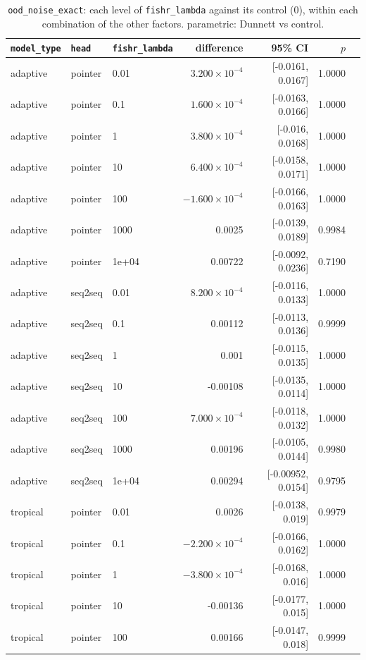 \documentclass[10pt]{article}
\begin{document}
{\small
\begin{longtable}{lllrrrl}
\caption{\texttt{ood\_noise\_exact}: each level of \texttt{fishr\_lambda} against its control (0), within each combination of the other factors. parametric: Dunnett vs control.}\label{tab:control-ood_noise_exact}\\
\toprule
\texttt{model\_type} & \texttt{head} & \texttt{fishr\_lambda} & difference & 95\% CI & $p$ & \\
\midrule
\endhead
adaptive & pointer & 0.01 & $3.200\times10^{-4}$ & [-0.0161, 0.0167] & 1.0000 & \\
adaptive & pointer & 0.1 & $1.600\times10^{-4}$ & [-0.0163, 0.0166] & 1.0000 & \\
adaptive & pointer & 1 & $3.800\times10^{-4}$ & [-0.016, 0.0168] & 1.0000 & \\
adaptive & pointer & 10 & $6.400\times10^{-4}$ & [-0.0158, 0.0171] & 1.0000 & \\
adaptive & pointer & 100 & $-1.600\times10^{-4}$ & [-0.0166, 0.0163] & 1.0000 & \\
adaptive & pointer & 1000 & 0.0025 & [-0.0139, 0.0189] & 0.9984 & \\
adaptive & pointer & 1e+04 & 0.00722 & [-0.0092, 0.0236] & 0.7190 & \\
adaptive & seq2seq & 0.01 & $8.200\times10^{-4}$ & [-0.0116, 0.0133] & 1.0000 & \\
adaptive & seq2seq & 0.1 & 0.00112 & [-0.0113, 0.0136] & 0.9999 & \\
adaptive & seq2seq & 1 & 0.001 & [-0.0115, 0.0135] & 1.0000 & \\
adaptive & seq2seq & 10 & -0.00108 & [-0.0135, 0.0114] & 1.0000 & \\
adaptive & seq2seq & 100 & $7.000\times10^{-4}$ & [-0.0118, 0.0132] & 1.0000 & \\
adaptive & seq2seq & 1000 & 0.00196 & [-0.0105, 0.0144] & 0.9980 & \\
adaptive & seq2seq & 1e+04 & 0.00294 & [-0.00952, 0.0154] & 0.9795 & \\
tropical & pointer & 0.01 & 0.0026 & [-0.0138, 0.019] & 0.9979 & \\
tropical & pointer & 0.1 & $-2.200\times10^{-4}$ & [-0.0166, 0.0162] & 1.0000 & \\
tropical & pointer & 1 & $-3.800\times10^{-4}$ & [-0.0168, 0.016] & 1.0000 & \\
tropical & pointer & 10 & -0.00136 & [-0.0177, 0.015] & 1.0000 & \\
tropical & pointer & 100 & 0.00166 & [-0.0147, 0.018] & 0.9999 & \\

\end{longtable}}
\end{document}
